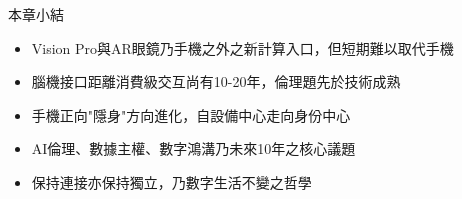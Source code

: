 \begin{tcbsummary}{本章小結}
\begin{itemize}
  \item Vision Pro與AR眼鏡乃手機之外之新計算入口，但短期難以取代手機
  \item 腦機接口距離消費級交互尚有10-20年，倫理題先於技術成熟
  \item 手機正向"隱身"方向進化，自設備中心走向身份中心
  \item AI倫理、數據主權、數字鴻溝乃未來10年之核心議題
  \item 保持連接亦保持獨立，乃數字生活不變之哲學
\end{itemize}

\end{tcbsummary}

